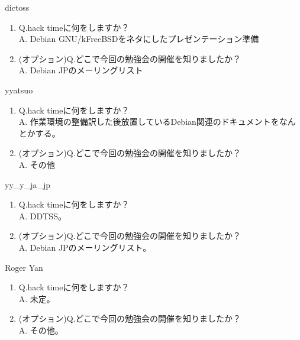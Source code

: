 \begin{prework}{ dictoss }
  \begin{enumerate}
  \item Q.hack timeに何をしますか？\\
    A. Debian GNU/kFreeBSDをネタにしたプレゼンテーション準備
  \item (オプション)Q.どこで今回の勉強会の開催を知りましたか？\\
    A. Debian JPのメーリングリスト
  \end{enumerate}
\end{prework}

\begin{prework}{ yyatsuo  }
  \begin{enumerate}
  \item Q.hack timeに何をしますか？\\
    A. 作業環境の整備訳した後放置しているDebian関連のドキュメントをなんとかする。
  \item (オプション)Q.どこで今回の勉強会の開催を知りましたか？\\
    A. その他
  \end{enumerate}
\end{prework}

\begin{prework}{ yy\_y\_ja\_jp }
  \begin{enumerate}
  \item Q.hack timeに何をしますか？\\
    A. DDTSS。
  \item (オプション)Q.どこで今回の勉強会の開催を知りましたか？\\
    A. Debian JPのメーリングリスト。
  \end{enumerate}
\end{prework}

\begin{prework}{ Roger Yan  }
  \begin{enumerate}
  \item Q.hack timeに何をしますか？\\
    A. 未定。
  \item (オプション)Q.どこで今回の勉強会の開催を知りましたか？\\
    A. その他。
  \end{enumerate}
\end{prework}

